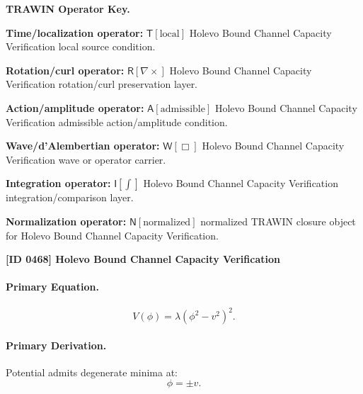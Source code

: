 \par\vspace{0.45\baselineskip}
\noindent\begin{minipage}[t]{\linewidth}
\begingroup
\small
\raggedright
\textbf{TRAWIN Operator Key.}\par
\noindent\textbf{Time/localization operator:} $\mathsf{T}\!\left[\mathrm{local}\right]$ Holevo Bound Channel Capacity Verification local source condition.\par
\noindent\textbf{Rotation/curl operator:} $\mathsf{R}\!\left[\nabla\times\right]$ Holevo Bound Channel Capacity Verification rotation/curl preservation layer.\par
\noindent\textbf{Action/amplitude operator:} $\mathsf{A}\!\left[\mathrm{admissible}\right]$ Holevo Bound Channel Capacity Verification admissible action/amplitude condition.\par
\noindent\textbf{Wave/d'Alembertian operator:} $\mathsf{W}\!\left[\Box\right]$ Holevo Bound Channel Capacity Verification wave or operator carrier.\par
\noindent\textbf{Integration operator:} $\mathsf{I}\!\left[\int\right]$ Holevo Bound Channel Capacity Verification integration/comparison layer.\par
\noindent\textbf{Normalization operator:} $\mathsf{N}\!\left[\mathrm{normalized}\right]$ normalized TRAWIN closure object for Holevo Bound Channel Capacity Verification.\par
\endgroup
\end{minipage}

\clearpage
\noindent\textbf{[ID 0468] Holevo Bound Channel Capacity Verification}\par
\vspace{0.35em}
\paragraph{Primary Equation.}
\begin{equation}
V(\phi) = \lambda(\phi^2 - v^2)^2.
\end{equation}

\paragraph{Primary Derivation.}
Potential admits degenerate minima at:
\begin{equation}
\phi = \pm v.
\end{equation}

